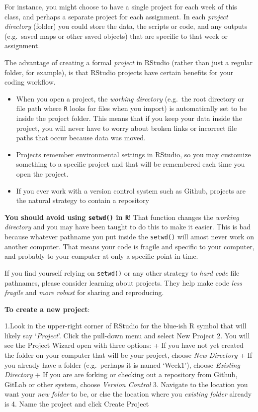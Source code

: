 \documentclass[
]{book}
\providecommand{\tightlist}{%
  \setlength{\itemsep}{0pt}\setlength{\parskip}{0pt}}
\newenvironment{rmdcaution}[1]
  {
  \begin{itemize}
  \renewcommand{\labelitemi}{
    \raisebox{-.7\height}[0pt][0pt]{
      {\setkeys{Gin}{width=3em,keepaspectratio}\texttt{[image: images/\#1]}}
    }
  }
  \setlength{\fboxsep}{1em}
  \begin{caution}
  \item
  }
  {
  \end{caution}
  \end{itemize}
  }
\begin{document}
For instance, you might choose to have a single project for each week of this class, and perhaps a separate project for each assignment. In each \emph{project directory} (folder) you could store the data, the scripts or code, and any outputs (e.g.~saved maps or other saved objects) that are specific to that week or assignment.

The advantage of creating a formal \emph{project} in RStudio (rather than just a regular folder, for example), is that RStudio projects have certain benefits for your coding workflow.

\begin{itemize}
\tightlist
\item
  When you open a project, the \emph{working directory} (e.g.~the root directory or file path where \texttt{R} looks for files when you import) is automatically set to be inside the project folder. This means that if you keep your data inside the project, you will never have to worry about broken links or incorrect file paths that occur because data was moved.
\item
  Projects remember environmental settings in RStudio, so you may customize something to a specific project and that will be remembered each time you open the project.
\item
  If you ever work with a version control system such as Github, projects are the natural strategy to contain a repository
\end{itemize}

\begin{rmdcaution}{caution}
\textbf{You should avoid using \texttt{setwd()} in \texttt{R}}! That function changes the \emph{working directory} and you may have been taught to do this to make it easier. This is bad because whatever pathname you put inside the \texttt{setwd()} will amost never work on another computer. That means your code is fragile and specific to your computer, and probably to your computer at only a specific point in time.

If you find yourself relying on \texttt{setwd()} or any other strategy to \emph{hard code} file pathnames, please consider learning about projects. They help make code \emph{less fragile} and \emph{more robust} for sharing and reproducing.

\end{rmdcaution}

\textbf{To create a new project}:

1.Look in the upper-right corner of RStudio for the blue-ish R symbol that will likely say `\emph{Project}'. Click the pull-down menu and select New Project
2. You will see the Project Wizard open with three options:
+ If you have not yet created the folder on your computer that will be your project, choose \emph{New Directory}
+ If you already have a folder (e.g.~perhaps it is named `Week1'), choose \emph{Existing Directory}
+ If you are are forking or checking out a repository from Github, GitLab or other system, choose \emph{Version Control}
3. Navigate to the location you want your \emph{new folder} to be, or else the location where you \emph{existing folder} already is
4. Name the project and click Create Project
\end{document}
